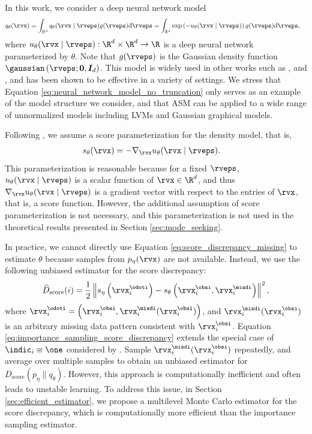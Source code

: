 \documentclass{article} %
\begin{document}
In this work, we consider a deep neural network model
\begin{align}
	q_{\theta}(\rvx) &= \int_{\mathbb{R}^{d}} q_{\theta}(\rvx \mid \rveps) g(\rveps) \mathrm{d} \rveps  \label{eq:neural_network_model_no_truncation}
	= \int_{\mathbb{R}^{d}} \exp\left(-u_{\theta}(\rvx \mid \rveps)\right) g(\rveps) \mathrm{d} \rveps,
\end{align}
where $u_{\theta}(\rvx \mid \rveps): \R^{d} \times \R^{d} \to \R$ is a deep neural network parameterized by $\theta$. Note that $g(\rveps)$ is the Gaussian density function $\gaussian\left( \rveps ; \bm{0}, \bm{I}_{d} \right)$. This model is widely used in other works such as \citet{Song2019}, and \citet{Song2020a}, and has been shown to be effective in a variety of settings. We stress that Equation \eqref{eq:neural_network_model_no_truncation} only serves as an example of the model structure we consider, and that ASM can be applied to a wide range of unnormalized models including LVMs and Gaussian graphical models.

Following \citet{Song2019}, we assume a score parameterization for the density model, that is, 
\begin{align}
	s_{\theta}(\rvx) &= - \nabla_{\rvx} u_{\theta}(\rvx \mid \rveps). \label{eq:score_parameterization}
\end{align}
This parameterization is reasonable because for a fixed $\rveps$, $u_{\theta}(\rvx \mid \rveps)$ is a scalar function of $\rvx \in \R^{d}$, and thus $\nabla_{\rvx} u_{\theta}(\rvx \mid \rveps)$ is a gradient vector with respect to the entries of $\rvx$, that is, a score function. However, the additional assumption of score parameterization is not necessary, and this parameterization is not used in the theoretical results presented in Section \ref{sec:mode_seeking}.

In practice, we cannot directly use Equation \eqref{eq:score_discrepancy_missing} to estimate $\theta$ because samples from $p_{\eta}(\rvx)$ are not available. Instead, we use the following unbiased estimator for the score discrepancy:
\begin{align}
	\widehat{D}_{\text{score}}(i) = \frac{1}{2} \left\| s_{\eta} \left( \rvx_{i}^{\odoti} \right) - s_{\theta} \left( \rvx_{i}^{\obsi}, \rvx_{i}^{\misdi} \right) \right\|^{2}, \label{eq:importance_sampling_score_discrepancy}
\end{align}
where $\rvx_{i}^{\odoti} = \left( \rvx_{i}^{\obsi}, \rvx_{i}^{\misdi}(\rvx_{i}^{\obsi}) \right)$, and $\rvx_{i}^{\misdi}(\rvx_{i}^{\obsi})$ is an arbitrary missing data pattern consistent with $\rvx_{i}^{\obsi}$. 
Equation \eqref{eq:importance_sampling_score_discrepancy} extends the special case of $\indic_{i} \equiv \one$ considered by \citet{Uehara2020}. Sample $\rvx_{i}^{\misdi}(\rvx_{i}^{\obsi})$ repeatedly, and average over multiple samples to obtain an unbiased estimator for $D_{\text{score}}(p_{\eta} \| q_{\theta})$. However, this approach is computationally inefficient and often leads to unstable learning. To address this issue, in Section \ref{sec:efficient_estimator}, we propose a multilevel Monte Carlo estimator for the score discrepancy, which is computationally more efficient than the importance sampling estimator.
\end{document}
